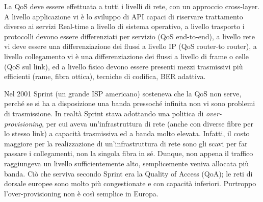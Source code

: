 La QoS deve essere effettuata a tutti i livelli di rete, con un approccio cross-layer. A livello applicazione vi è lo sviluppo di API capaci di riservare trattamento diverso ai servizi Real-time a livello di sistema operativo, a livello trasporto i protocolli devono essere differenziati per servizio (QoS end-to-end), a livello rete vi deve essere una differenziazione dei flussi a livello IP (QoS router-to router), a livello collegamento vi è una differenziazione dei flussi a livello di frame o celle (QoS sul link), ed a livello fisico devono essere presenti mezzi trasmissivi più efficienti (rame, fibra ottica), tecniche di codifica, BER adattiva.

Nel 2001 Sprint (un grande ISP americano) sosteneva che la QoS non serve, perché se si ha a disposizione una banda pressoché infinita non vi sono problemi di trasmissione. In realtà Sprint stava adottando una politica di \textit{over-provisioning}, per cui aveva un'infrastruttura di rete (anche con diverse fibre per lo stesso link) a capacità trasmissiva ed a banda molto elevata. Infatti, il costo maggiore per la realizzazione di un'infrastruttura di rete sono gli scavi per far passare i collegamenti, non la singola fibra in sé. Dunque, non appena il traffico raggiungeva un livello sufficientemente alto, semplicemente veniva allocata più banda. Ciò che serviva secondo Sprint era la Quality of Access (QoA); le reti di dorsale europee sono molto più congestionate e con capacità inferiori. Purtroppo l'over-provisioning non è così semplice in Europa.

